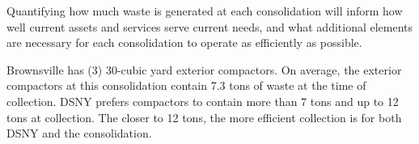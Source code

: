 
    Quantifying how much waste is generated at each consolidation will inform how well current assets and services serve current needs, and what additional elements are necessary for each consolidation to operate as efficiently as possible.
    
    Brownsville has (3) 30-cubic yard exterior compactors. On average, the exterior compactors at this consolidation contain 7.3 tons of waste at the time of collection. DSNY prefers compactors to contain more than 7 tons and up to 12 tons at collection. The closer to 12 tons, the more efficient collection is for both DSNY and the consolidation.
